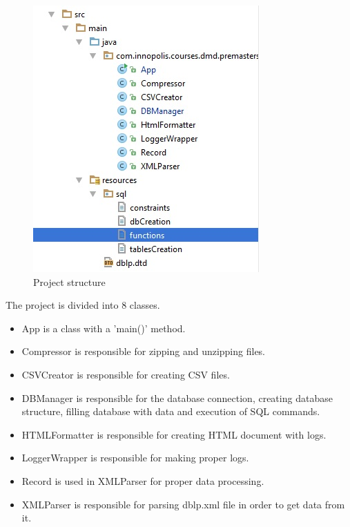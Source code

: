 \documentclass{acm_proc_article-sp}
\begin{document}
\begin{figure}[h]
	\centering
	\includegraphics[width=0.7\linewidth]{ProjectStructure}
	\caption{Project structure}
	\label{fig:ProjectStructure}
\end{figure}

The project is divided into 8 classes.
\begin{itemize}
	\item App is a class with a 'main()' method.
	\item Compressor is responsible for zipping and unzipping files.
	\item CSVCreator is responsible for creating CSV files.
	\item DBManager is responsible for the database connection, creating database structure, filling database with data and execution of SQL commands.
	\item HTMLFormatter is responsible for creating HTML document with logs.
	\item LoggerWrapper is responsible for making proper logs.
	\item Record is used in XMLParser for proper data processing.
	\item XMLParser is responsible for parsing dblp.xml file in order to get data from it.
\end{itemize}



\end{document}
